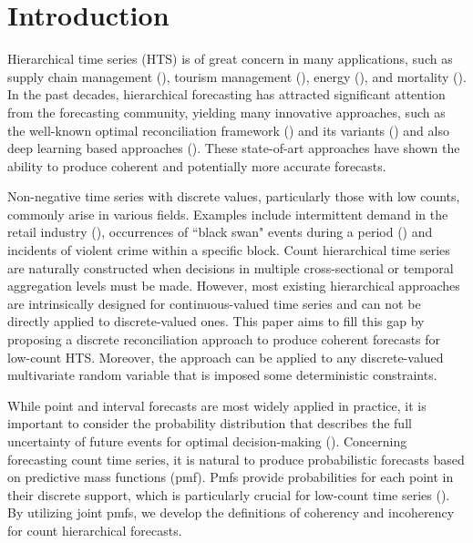 \documentclass[a4paper,review,12pt,authoryear]{elsarticle}
\begin{document}
\section{Introduction}

Hierarchical time series (HTS) is of great concern in many applications, such as supply chain management (\citealp{babaiDemandForecastingSupply2022}), tourism management (\citealp{kourentzesCrosstemporalCoherentForecasts2019}), energy (\citealp{nystrupTemporalHierarchiesAutocorrelation2020}), and mortality (\citealp{liHierarchicalMortalityForecasting2022}).
In the past decades, hierarchical forecasting has attracted significant attention from the forecasting community, yielding many innovative approaches, such as the well-known optimal reconciliation framework (\citealp{hyndmanOptimalCombinationForecasts2011, wickramasuriyaOptimalForecastReconciliation2019, panagiotelisProbabilisticForecastReconciliation2022}) and its variants () and also deep learning based approaches (\citealp{rangapuramEndtoEndLearningCoherent2021}).
These state-of-art approaches have shown the ability to produce coherent and potentially more accurate forecasts.

Non-negative time series with discrete values, particularly those with low counts, commonly arise in various fields. 
Examples include intermittent demand in the retail industry (\citealp{kourentzesElucidateStructureIntermittent2021}), occurrences of ``black swan" events during a period (\citealp{nikolopoulosWeNeedTalk2020}) and incidents of violent crime within a specific block.
Count hierarchical time series are naturally constructed when decisions in multiple cross-sectional or temporal aggregation levels must be made.
However, most existing hierarchical approaches are intrinsically designed for continuous-valued time series and can not be directly applied to discrete-valued ones. 
This paper aims to fill this gap by proposing a discrete reconciliation approach to produce coherent forecasts for low-count HTS. 
Moreover, the approach can be applied to any discrete-valued multivariate random variable that is imposed some deterministic constraints.  


While point and interval forecasts are most widely applied in practice, it is important to consider the probability distribution that describes the full uncertainty of future events for optimal decision-making (\citealp{gneitingProbabilisticForecasting2014}).
Concerning forecasting count time series, it is natural to produce probabilistic forecasts based on predictive mass functions (pmf). 
Pmfs provide probabilities for each point in their discrete support,
which is particularly crucial for low-count time series (\citealp{petropoulosForecastingTheoryPractice2022a}).
By utilizing joint pmfs, we develop the definitions of coherency and incoherency for count hierarchical forecasts.
\end{document}
